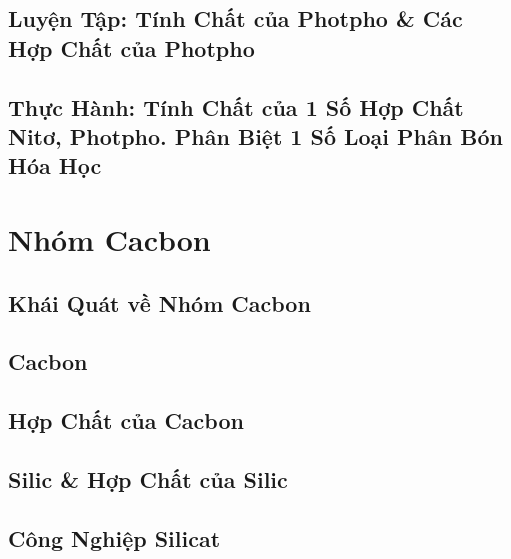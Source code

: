 \documentclass[oneside]{book}
\numberwithin{equation}{section}
\begin{document}
\section{Luyện Tập: Tính Chất của Photpho \& Các Hợp Chất của Photpho}


\section{Thực Hành: Tính Chất của 1 Số Hợp Chất Nitơ, Photpho. Phân Biệt 1 Số Loại Phân Bón Hóa Học}


\chapter{Nhóm Cacbon}

\section{Khái Quát về Nhóm Cacbon}


\section{Cacbon}


\section{Hợp Chất của Cacbon}


\section{Silic \& Hợp Chất của Silic}


\section{Công Nghiệp Silicat}
\end{document}
